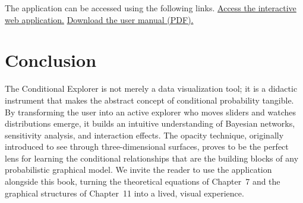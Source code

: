 The application can be accessed using the following links.
\href{https://enriquecastilloron.github.io/mi-libro-interactivo/apps/ConditionalExplorerFINAL.html}
{\textcolor{accentblue}{Access the interactive web application.}}
\href{https://raw.githubusercontent.com/EnriqueCastilloRon/mi-libro-interactivo/main/manuales/Manual_ConditionalDimensionalExplorer.pdf}
{\textcolor{accentblue}{Download the user manual (PDF).}}

\section{Conclusion}

The Conditional Explorer is not merely a data visualization tool; it is a didactic instrument that makes the abstract concept of conditional probability tangible. By transforming the user into an active explorer who moves sliders and watches distributions emerge, it builds an intuitive understanding of Bayesian networks, sensitivity analysis, and interaction effects. The opacity technique, originally introduced to see through three-dimensional surfaces, proves to be the perfect lens for learning the conditional relationships that are the building blocks of any probabilistic graphical model. We invite the reader to use the application alongside this book, turning the theoretical equations of Chapter~7 and the graphical structures of Chapter~11 into a lived, visual experience. 